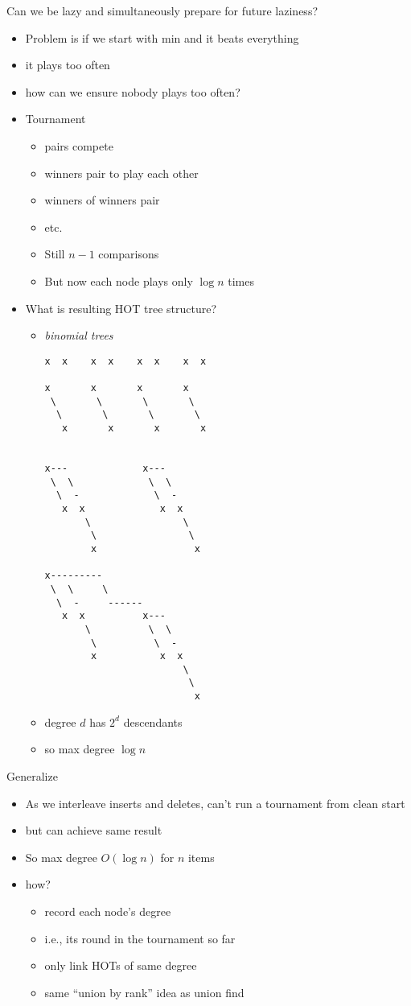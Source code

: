 \documentclass{article}
\begin{document}
Can we be lazy and simultaneously prepare for future laziness?
\begin{itemize}
\item Problem is if we start with min and it beats everything
\item it plays too often
\item how can we ensure nobody plays too often?
\item Tournament
\begin{itemize}
\item pairs compete
\item winners pair to play each other
\item winners of winners pair
\item etc.
\item Still $n-1$ comparisons
\item But now each node plays only $\log n$ times
\end{itemize}
\item What is resulting HOT tree structure?
\begin{itemize}
\item \emph{binomial trees}
\begin{verbatim}
x  x    x  x    x  x    x  x

x       x       x       x
 \       \       \       \
  \       \       \       \
   x       x       x       x


x---             x---     
 \  \             \  \   
  \  -             \  -  
   x  x             x  x 
       \                \
        \                \
        x                 x

x---------             
 \  \     \         
  \  -     ------      
   x  x          x---     
       \          \  \ 
        \          \  - 
        x           x  x 
                        \
                         \
                          x
\end{verbatim}
\item degree $d$ has $2^d$ descendants
\item so max degree $\log n$
\end{itemize}
\end{itemize}

Generalize
\begin{itemize}
\item As we interleave inserts and deletes, can't run a tournament
  from clean start
\item but can achieve same result
\item So max degree $O(\log n)$ for $n$ items
\item how? 
\begin{itemize}
\item record each node's degree
\item i.e., its round in the tournament so far
\item only link HOTs of same degree
\item same ``union by rank'' idea as union find
\end{itemize}
\end{itemize}
\end{document}
